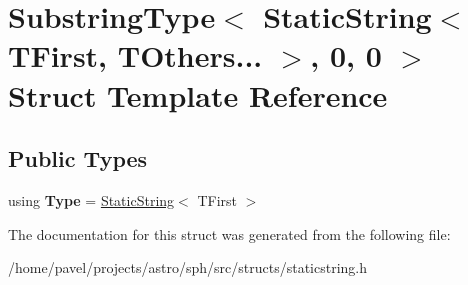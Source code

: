 \hypertarget{structSubstringType_3_01StaticString_3_01TFirst_00_01TOthers_8_8_8_01_4_00_010_00_010_01_4}{}\section{Substring\+Type$<$ Static\+String$<$ T\+First, T\+Others... $>$, 0, 0 $>$ Struct Template Reference}
\label{structSubstringType_3_01StaticString_3_01TFirst_00_01TOthers_8_8_8_01_4_00_010_00_010_01_4}
\subsection*{Public Types}
\begin{DoxyCompactItemize}
\item 
\hypertarget{structSubstringType_3_01StaticString_3_01TFirst_00_01TOthers_8_8_8_01_4_00_010_00_010_01_4_ad15cc6ed110a250bb8eb8f70e39c2613}{}\label{structSubstringType_3_01StaticString_3_01TFirst_00_01TOthers_8_8_8_01_4_00_010_00_010_01_4_ad15cc6ed110a250bb8eb8f70e39c2613} 
using {\bfseries Type} = \hyperlink{structStaticString}{Static\+String}$<$ T\+First $>$
\end{DoxyCompactItemize}


The documentation for this struct was generated from the following file\+:\begin{DoxyCompactItemize}
\item 
/home/pavel/projects/astro/sph/src/structs/staticstring.\+h\end{DoxyCompactItemize}
